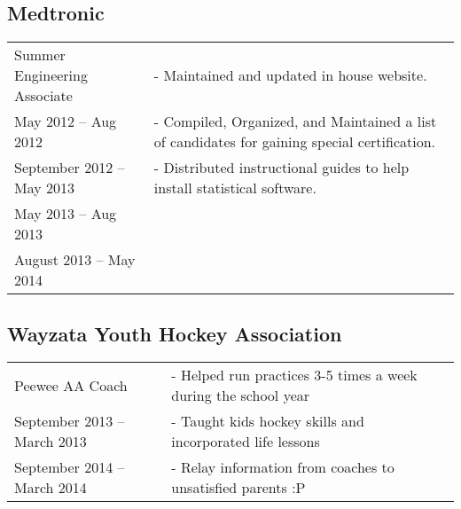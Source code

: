 \documentclass{article}[11pt]
\begin{document}
	\subsection*{Medtronic}
	\begin{tabular}{l l}
	Summer Engineering Associate 	& - Maintained and updated in house website.\\
	May 2012 -- Aug 2012 		& - Compiled, Organized, and Maintained a list of candidates for gaining special certification. \\
	September 2012 -- May 2013 	& - Distributed instructional guides to help install statistical software. \\
	May 2013 -- Aug 2013 		& \\
	August 2013 -- May 2014 	& \\
	\end{tabular}
	\hfill
	\subsection*{Wayzata Youth Hockey Association}
	\begin{tabular}{l l}
	Peewee AA Coach 		& - Helped run practices 3-5 times a week during the school year \\
	September 2013 -- March 2013 	& - Taught kids hockey skills and incorporated life lessons \\
	September 2014 -- March 2014 	& - Relay information from coaches to unsatisfied parents :P\\
	\end{tabular}
\end{document}
